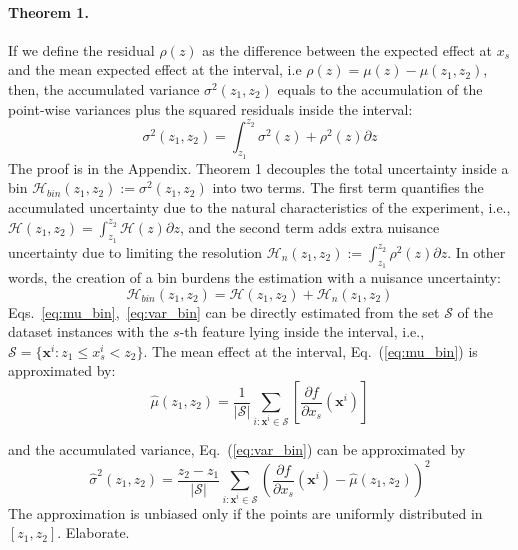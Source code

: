 \documentclass[twoside]{article}
\newcommand{\dfdx}{\frac{\partial f}{\partial x_s}}
\begin{document}
\paragraph{Theorem 1.} If we define the residual \(\rho(z)\) as the
difference between the expected effect at \(x_s\) and the mean
expected effect at the interval, i.e
\(\rho(z) = \mu(z) - \mu(z_1, z_2)\), then, the accumulated variance
\(\sigma^2(z_1, z_2)\) equals to the accumulation of the point-wise
variances plus the squared residuals inside the interval:
\begin{equation}
 \sigma^2(z_1, z_2) = \int_{z_1}^{z_2} \sigma^2(z) + \rho^2(z) \partial z
\end{equation}
%
The proof is in the Appendix. Theorem 1 decouples the total
uncertainty inside a bin
\(\mathcal{H}_{bin}(z_1, z_2) := \sigma^2(z_1, z_2)\) into two terms. The first term quantifies
the accumulated uncertainty due to the natural characteristics of the
experiment, i.e.,
\(\mathcal{H}(z_1, z_2) = \int_{z_1}^{z_2}\mathcal{H}(z) \partial z\),
and the second term adds extra nuisance uncertainty due to limiting
the resolution
\(\mathcal{H}_n(z_1, z_2) := \int_{z_1}^{z_2}\rho^2(z) \partial z
\). In other words, the creation of a bin burdens the estimation with
a nuisance uncertainty:
\begin{equation}
  \label{eq:uncertainty_bin}
  \mathcal{H}_{bin}(z_1, z_2) = \mathcal{H}(z_1, z_2) + \mathcal{H}_n(z_1, z_2)
\end{equation}
Eqs.~\eqref{eq:mu_bin},~\eqref{eq:var_bin} can be directly estimated
from the set \(\mathcal{S}\) of the dataset instances with the
\(s\)-th feature lying inside the interval, i.e.,
\( \mathcal{S}= \{ \mathbf{x}^i : z_1 \leq x^i_s < z_2 \} \). The mean
effect at the interval, Eq.~(\ref{eq:mu_bin}) is approximated by:
\begin{equation}
  \label{eq:mean_estimation}
  \hat{\mu}(z_1, z_2) = \frac{1}{|\mathcal{S}|} \sum_{i:\mathbf{x}^i \in
    \mathcal{S}} \left [ \dfdx(\mathbf{x}^i) \right ]
\end{equation}

and the accumulated variance, Eq.~(\ref{eq:var_bin}) can be
approximated by
\begin{equation}
  \label{eq:variance_estimation}
  \hat{\sigma}^2(z_1, z_2) = \frac{z_2 - z_1}{|\mathcal{S}|} \sum_{i:\mathbf{x}^i \in
    \mathcal{S}} \left ( \dfdx(\mathbf{x}^i) - \hat{\mu}(z_1, z_2) \right )^2
\end{equation}
The approximation is unbiased only if the points are uniformly
distributed in \([z_1, z_2]\). Elaborate.
\end{document}
